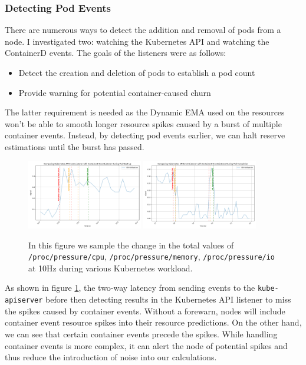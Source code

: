 \subsubsection{Detecting Pod Events}
There are numerous ways to detect the addition and removal of pods from a node.
I investigated two: watching the Kubernetes API and watching the ContainerD
events. The goals of the listeners were as follows:
\begin{itemize}
    \item Detect the creation and deletion of pods to establish a pod count
    \item Provide warning for potential container-caused churn
\end{itemize}
The latter requirement is needed as the Dynamic EMA used on the resources won't
be able to smooth longer resource spikes caused by a burst of multiple container
events. Instead, by detecting pod events earlier, we can halt reserve
estimations until the burst has passed.

\begin{figure}[H]
    \centering
    \includegraphics[width=0.45\textwidth]{images/event-comparison-start.png}
    \includegraphics[width=0.45\textwidth]{images/event-comparison-end.png}
    \caption{In this figure we sample the change in the total values of
    \texttt{/proc/pressure/cpu}, \texttt{/proc/pressure/memory},
    \texttt{/proc/pressure/io} at 10Hz during various Kubernetes workload.}
    \label{fig:event-evaluation}
\end{figure}


As shown in figure \ref{fig:event-evaluation}, the two-way latency from sending events
to the \verb|kube-apiserver| before then detecting results in the Kubernetes API
listener to miss the spikes caused by container events. Without a forewarn, nodes
will include container event resource spikes into their resource predictions. On
the other hand, we can see that certain container events precede the spikes.
While handling container events is more complex, it can alert the node of
potential spikes and thus reduce the introduction of noise into our
calculations.

